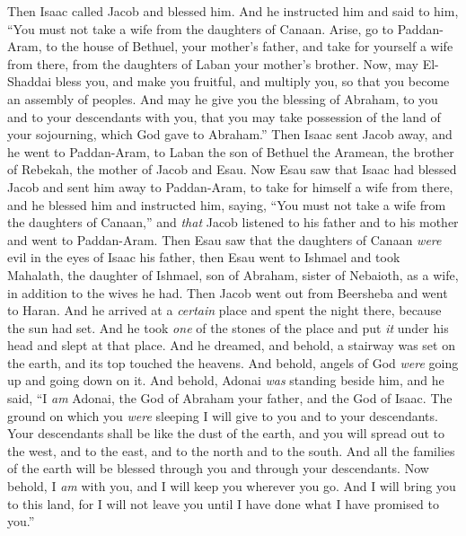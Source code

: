 \begin{biblechapter} %
 Then Isaac called Jacob and blessed him. And he instructed him and said to him, “You must not take a wife from the daughters of Canaan.
\verse Arise, go to Paddan-Aram, to the house of Bethuel, your mother’s father, and take for yourself a wife from there, from the daughters of Laban your mother’s brother.
\verse Now, may El-Shaddai bless you, and make you fruitful, and multiply you, so that you become an assembly of peoples.
\verse And may he give you the blessing of Abraham, to you and to your descendants with you, that you may take possession of the land of your sojourning, which God gave to Abraham.”
\verse Then Isaac sent Jacob away, and he went to Paddan-Aram, to Laban the son of Bethuel the Aramean, the brother of Rebekah, the mother of Jacob and Esau.
\verse Now Esau saw that Isaac had blessed Jacob and sent him away to Paddan-Aram, to take for himself a wife from there, and he blessed him and instructed him, saying, “You must not take a wife from the daughters of Canaan,”
\verse and \textit{that} Jacob listened to his father and to his mother and went to Paddan-Aram.
\verse Then Esau saw that the daughters of Canaan \textit{were} evil in the eyes of Isaac his father,
\verse then Esau went to Ishmael and took Mahalath, the daughter of Ishmael, son of Abraham, sister of Nebaioth, as a wife, in addition to the wives he had.
 Then Jacob went out from Beersheba and went to Haran.
\verse And he arrived at a \textit{certain} place and spent the night there, because the sun had set. And he took \textit{one} of the stones of the place and put \textit{it} under his head and slept at that place.
\verse And he dreamed, and behold, a stairway was set on the earth, and its top touched the heavens. And behold, angels of God \textit{were} going up and going down on it.
\verse And behold, Adonai \textit{was} standing beside him, and he said, “I \textit{am} Adonai, the God of Abraham your father, and the God of Isaac. The ground on which you \textit{were} sleeping I will give to you and to your descendants.
\verse Your descendants shall be like the dust of the earth, and you will spread out to the west, and to the east, and to the north and to the south. And all the families of the earth will be blessed through you and through your descendants.
\verse Now behold, I \textit{am} with you, and I will keep you wherever you go. And I will bring you to this land, for I will not leave you until I have done what I have promised to you.”

\end{biblechapter}
